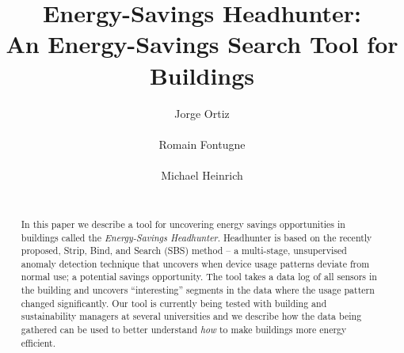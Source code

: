 \documentclass{sig-alternate-ipsn13}
\title{Energy-Savings Headhunter: \\An Energy-Savings Search Tool for Buildings}
\author{
%
%
\alignauthor
Jorge Ortiz\\
       \affaddr{U.C. Berkeley}\\
       \email{jortiz@cs.berkeley.edu}
\alignauthor
Romain Fontugne\\
       \affaddr{University of Tokyo}\\
       \email{romain@hongo.wide.ad.jp}
\alignauthor Michael Heinrich\\
       \affaddr{Pangia Corporation}\\
       \email{michael@greenpangia.com}
}
\begin{document}
\maketitle

\begin{abstract}
In this paper we describe a tool for uncovering energy savings opportunities in buildings called 
the \emph{Energy-Savings Headhunter}.  Headhunter is based on the recently proposed, Strip, Bind, and
Search (SBS) method -- a multi-stage, unsupervised anomaly detection technique that uncovers when device
usage patterns deviate from normal use; a potential savings opportunity.  The tool
takes a data log of all sensors in the building and uncovers ``interesting'' segments in the data
where the usage pattern changed significantly.  Our tool is 
currently being tested with building and sustainability managers at several universities and we  
describe how the data being gathered can be used to better understand \emph{how} to make buildings
more energy efficient.
\end{abstract}







\small


\end{document}
